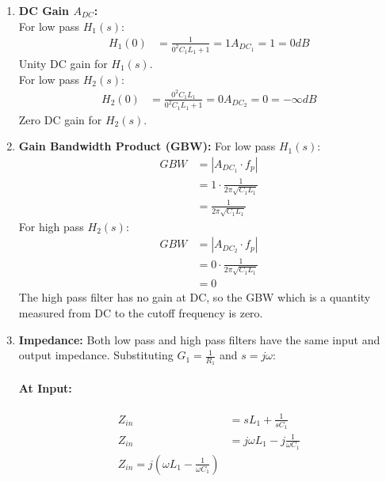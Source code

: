 \begin{enumerate}
\begin{align*}
        f_z &= \frac{|s_z|}{2\pi} = 0 Hz
    \end{align*}
    Zero at the origin for \(H_2(s)\).
  \item \textbf{DC Gain \(A_{DC}\):} \\
    For low pass \(H_1(s)\):
    \begin{align*}
      H_1(0) &= \frac{1}{0^2C_1L_1 + 1} = 1
      A_{DC_1} = 1 = 0 dB
    \end{align*}
    Unity DC gain for \(H_1(s)\). \\
    For low pass \(H_2(s)\):
    \begin{align*}
      H_2(0) &= \frac{0^2C_1L_1}{0^2C_1L_1 + 1} = 0
      A_{DC_2} = 0 = -\infty dB
    \end{align*}
    Zero DC gain for \(H_2(s)\).
  \item \textbf{Gain Bandwidth Product (GBW):}
    For low pass \(H_1(s)\):
    \begin{align*}
      GBW &= |A_{DC_1} \cdot f_p| \\
          &= 1 \cdot \frac{1}{2 \pi \sqrt{C_1L_1}} \\
          &= \frac{1}{2 \pi \sqrt{C_1L_1}}
    \end{align*}
    For high pass \(H_2(s)\):
    \begin{align*}
      GBW &= |A_{DC_2} \cdot f_p| \\
          &= 0 \cdot \frac{1}{2 \pi \sqrt{C_1L_1}} \\
          &= 0
    \end{align*}
    The high pass filter has no gain at DC, so the GBW which
    is a quantity measured from DC to the cutoff frequency is
    zero.
  \item \textbf{Impedance:}
    Both low pass and high pass filters have the same input
    and output impedance.
    Substituting \(G_1 = \frac{1}{R_1}\) and \(s = j \omega\):
    \paragraph{At Input:}
      \begin{align*}
        Z_{in} &= sL_1 + \frac{1}{sC_1} \\
        Z_{in} &= j \omega L_1 - j \frac{1}{\omega C_1} \\
        Z_{in} = j \left( \omega L_1 - \frac{1}{\omega C_1} \right)
      \end{align*}

\end{enumerate}
